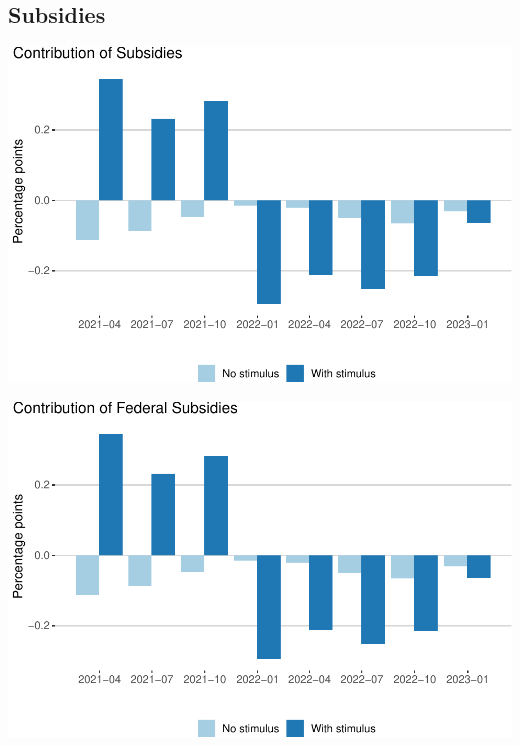 \documentclass[
]{article}
\begin{document}
\hypertarget{subsidies}{%
\subsection{Subsidies}\label{subsidies}}

\begin{center}\includegraphics{stimulus-changes_files/figure-latex/subsidies-1} \end{center}

\begin{center}\includegraphics{stimulus-changes_files/figure-latex/subsidies_federal-1} \end{center}
\end{document}
